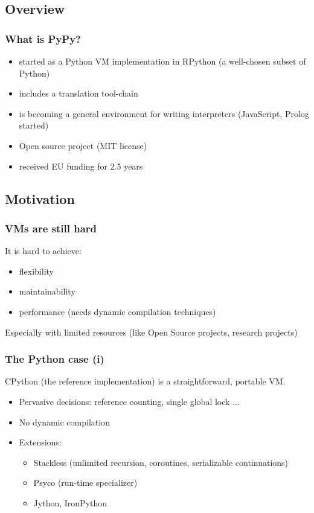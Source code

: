 \documentclass[utf8]{beamer}
\begin{document}
\subsection{Overview}
\begin{frame}
  \frametitle{What is PyPy?}
  \begin{itemize}
  \item
    started as a Python VM implementation
    in RPython (a well-chosen subset of Python)
  \item
    includes a translation tool-chain
  \item
    is becoming a general environment for writing interpreters (JavaScript, Prolog started)
  \item
    Open source project (MIT license)
  \item
    received EU funding for 2.5 years
  \end{itemize}

\end{frame}

\subsection{Motivation}
\begin{frame}
  \frametitle{VMs are still hard}
  It is hard to achieve:

  \begin{itemize}
  \item
    flexibility
  \item
    maintainability
  \item
    performance (needs dynamic compilation techniques)
  \end{itemize}
  Especially with limited resources (like Open Source projects, research projects)
\end{frame}


\begin{frame}
  \frametitle{The Python case (i)}
  CPython (the reference implementation) is a straightforward, portable VM.

  \begin{itemize}
  \item
    Pervasive decisions: reference counting, single global lock ...
  \item
    No dynamic compilation
  \item
    Extensions:
    \begin{itemize}
    \item
      \alert{Stackless} (unlimited recursion, coroutines, serializable continuations)
    \item
      \alert{Psyco} (run-time specializer)
    \item
      \alert{Jython}, \alert{IronPython}
    \end{itemize}
  \end{itemize}
\end{frame}
\end{document}

